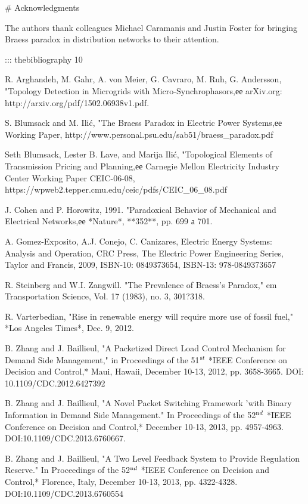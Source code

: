 # Acknowledgments

The authors thank colleagues Michael Caramanis and Justin Foster for bringing Braess paradox in distribution networks to their attention.

::: thebibliography 10

R. Arghandeh, M. Gahr, A. von Meier, G. Cavraro, M. Ruh, G. Andersson, "Topology Detection in Microgrids with Micro-Synchrophasors,ее arXiv.org: http://arxiv.org/pdf/1502.06938v1.pdf.

S. Blumsack and M. Ilić, "The Braess Paradox in Electric Power Systems,ее Working Paper, http://www.personal.psu.edu/sab51/braess_paradox.pdf

Seth Blumsack, Lester B. Lave, and Marija Ilić, "Topological Elements of Transmission Pricing and Planning,ее Carnegie Mellon Electricity Industry Center Working Paper CEIC-06-08, https://wpweb2.tepper.cmu.edu/ceic/pdfs/CEIC_06_08.pdf

J. Cohen and P. Horowitz, 1991. "Paradoxical Behavior of Mechanical and Electrical Networks,ее *Nature*, **352**, pp. 699 а 701.

A. Gomez-Exposito, A.J. Conejo, C. Canizares, Electric Energy Systems: Analysis and Operation, CRC Press, The Electric Power Engineering Series, Taylor and Francis, 2009, ISBN-10: 0849373654, ISBN-13: 978-0849373657

R. Steinberg and W.I. Zangwill. "The Prevalence of Braess's Paradox," em Transportation Science, Vol. 17 (1983), no. 3, 301?318.

R. Varterbedian, "Rise in renewable energy will require more use of fossil fuel," *Los Angeles Times*, Dec. 9, 2012.

B. Zhang and J. Baillieul, "A Packetized Direct Load Control Mechanism for Demand Side Management," in Proceedings of the 51$^{\textrm st}$ *IEEE Conference on Decision and Control,* Maui, Hawaii, December 10-13, 2012, pp. 3658-3665. DOI: 10.1109/CDC.2012.6427392

B. Zhang and J. Baillieul, "A Novel Packet Switching Framework 'with Binary Information in Demand Side Management." In Proceedings of the 52$^{\textrm nd}$ *IEEE Conference on Decision and Control,* December 10-13, 2013, pp. 4957-4963. DOI:10.1109/CDC.2013.6760667.

B. Zhang and J. Baillieul, "A Two Level Feedback System to Provide Regulation Reserve." In Proceedings of the 52$^{\textrm nd}$ *IEEE Conference on Decision and Control,* Florence, Italy, December 10-13, 2013, pp. 4322-4328. DOI:10.1109/CDC.2013.6760554


